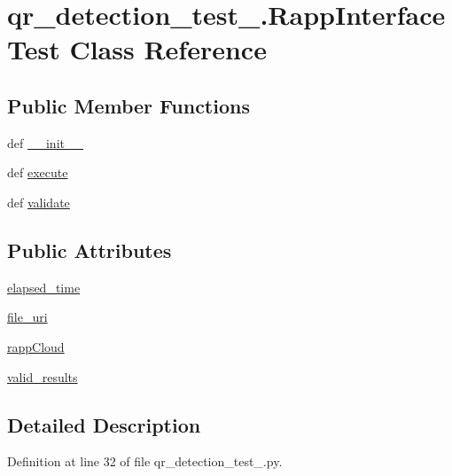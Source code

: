 \hypertarget{classqr__detection__test__1_1_1RappInterfaceTest}{\section{qr\-\_\-detection\-\_\-test\-\_.\-Rapp\-Interface\-Test Class Reference}
\label{classqr__detection__test__1_1_1RappInterfaceTest}
}
\subsection*{Public Member Functions}
\begin{DoxyCompactItemize}
\item 
def \hyperlink{classqr__detection__test__1_1_1RappInterfaceTest_a2b343de096d129bb7e3a1184c36b4665}{\-\_\-\-\_\-init\-\_\-\-\_\-}
\item 
def \hyperlink{classqr__detection__test__1_1_1RappInterfaceTest_a74603ecbb8f25ae8c094bb09ee769353}{execute}
\item 
def \hyperlink{classqr__detection__test__1_1_1RappInterfaceTest_aaff17eeade30669c9f475389652d3f96}{validate}
\end{DoxyCompactItemize}
\subsection*{Public Attributes}
\begin{DoxyCompactItemize}
\item 
\hyperlink{classqr__detection__test__1_1_1RappInterfaceTest_a43fe8804f15a602a70dc27448627090d}{elapsed\-\_\-time}
\item 
\hyperlink{classqr__detection__test__1_1_1RappInterfaceTest_a2a597d50e017f0d7c0f850fd50ab6740}{file\-\_\-uri}
\item 
\hyperlink{classqr__detection__test__1_1_1RappInterfaceTest_ae6d2ab2d088b79dc57a3d615dc832159}{rapp\-Cloud}
\item 
\hyperlink{classqr__detection__test__1_1_1RappInterfaceTest_ad00b6f3d01566426e34b35c33449e128}{valid\-\_\-results}
\end{DoxyCompactItemize}


\subsection{Detailed Description}


Definition at line 32 of file qr\-\_\-detection\-\_\-test\-\_.\-py.



